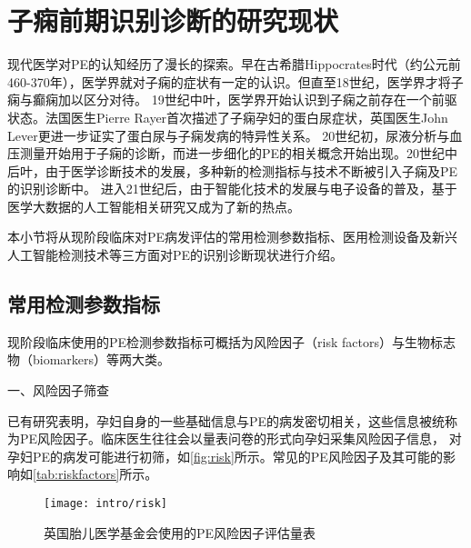 \section{子痫前期识别诊断的研究现状}
现代医学对PE的认知经历了漫长的探索\cite{BJOG2016}。早在古希腊Hippocrates时代（约公元前460-370年），医学界就对子痫的症状有一定的认识。但直至18世纪，医学界才将子痫与癫痫加以区分对待。
19世纪中叶，医学界开始认识到子痫之前存在一个前驱状态。法国医生Pierre Rayer首次描述了子痫孕妇的蛋白尿症状，英国医生John Lever更进一步证实了蛋白尿与子痫发病的特异性关系。
20世纪初，尿液分析与血压测量开始用于子痫的诊断，而进一步细化的PE的相关概念开始出现。20世纪中后叶，由于医学诊断技术的发展，多种新的检测指标与技术不断被引入子痫及PE的识别诊断中。
进入21世纪后，由于智能化技术的发展与电子设备的普及，基于医学大数据的人工智能相关研究又成为了新的热点。

本小节将从现阶段临床对PE病发评估的常用检测参数指标、医用检测设备及新兴人工智能检测技术等三方面对PE的识别诊断现状进行介绍。

\subsection{常用检测参数指标}
现阶段临床使用的PE检测参数指标可概括为风险因子（risk factors）与生物标志物（biomarkers）等两大类。

一、风险因子筛查

已有研究表明，孕妇自身的一些基础信息与PE的病发密切相关，这些信息被统称为PE风险因子\cite{Magee2008,FIGO,Lowe2015,Heazell2010}。临床医生往往会以量表问卷的形式向孕妇采集风险因子信息，
对孕妇PE的病发可能进行初筛\cite{risks}，如\autoref{fig:risk}所示。常见的PE风险因子及其可能的影响如\autoref{tab:riskfactors}所示。
\begin{figure}[htbp]
    \centering
    \texttt{[image: intro/risk]}
    \caption[英国胎儿医学基金会使用的PE风险因子评估量表]{\label{fig:risk}英国胎儿医学基金会使用的PE风险因子评估量表\cite{risks}}
\end{figure}

